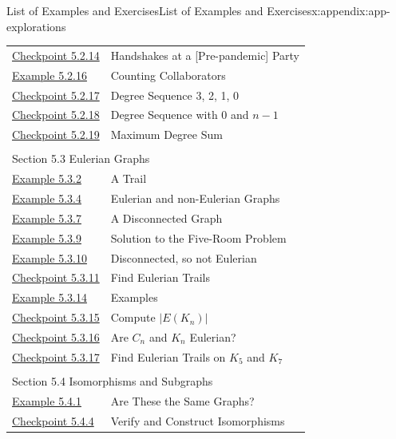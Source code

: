 \documentclass[oneside,10pt,]{book}
\numberwithin{equation}{section}
\begin{document}
\begin{appendixptx}{List of Examples and Exercises}{}{List of Examples and Exercises}{}{}{x:appendix:app-explorations}
\begin{longtable}[l]{ll}
\hyperref[x:exercise:ex-graph-handshake-lemma]{Checkpoint 5.2.14}& Handshakes at a [Pre-pandemic] Party\\
\hyperref[x:example:eg-graph-coauthors-answer]{Example 5.2.16}& Counting Collaborators\\
\hyperref[x:exercise:ex-graph-degree-0-4]{Checkpoint 5.2.17}& Degree Sequence 3, 2, 1, 0\\
\hyperref[x:exercise:ex-graph-degree-0-n-1]{Checkpoint 5.2.18}& Degree Sequence with 0 and \(n-1\)\\
\hyperref[x:exercise:ex-graph-degree-sum-max]{Checkpoint 5.2.19}& Maximum Degree Sum\\
\multicolumn{2}{l}{\null}\\[1.5ex] \multicolumn{2}{l}{\large Section 5.3 Eulerian Graphs}\\[0.5ex]
\hyperref[x:example:eg-graph-trail]{Example 5.3.2}& A Trail\\
\hyperref[x:example:eg-graph-eulerian]{Example 5.3.4}& Eulerian and non-Eulerian Graphs\\
\hyperref[x:example:eg-graph-connected]{Example 5.3.7}& A Disconnected Graph\\
\hyperref[x:example:eg-graph-model-room-solution]{Example 5.3.9}& Solution to the Five-Room Problem\\
\hyperref[x:example:eg-graph-not-eulerian]{Example 5.3.10}& Disconnected, so not Eulerian\\
\hyperref[x:exercise:ex-graph-find-eulerian-trail]{Checkpoint 5.3.11}& Find Eulerian Trails\\
\hyperref[x:example:eg-cycle-complete]{Example 5.3.14}& Examples\\
\hyperref[x:exercise:ex-graph-complete-edges]{Checkpoint 5.3.15}& Compute \(|E(K_n)|\)\\
\hyperref[x:exercise:ex-graph-cycle-complete-degrees]{Checkpoint 5.3.16}& Are \(C_n\) and \(K_n\) Eulerian?\\
\hyperref[x:exercise:ex-graph-complete-find-eulerian]{Checkpoint 5.3.17}& Find Eulerian Trails on \(K_5\) and \(K_7\)\\
\multicolumn{2}{l}{\null}\\[1.5ex] \multicolumn{2}{l}{\large Section 5.4 Isomorphisms and Subgraphs}\\[0.5ex]
\hyperref[x:example:eg-graph-equal-isomorphic]{Example 5.4.1}& Are These the Same Graphs?\\
\hyperref[x:exercise:ex-graph-isomorphism]{Checkpoint 5.4.4}& Verify and Construct Isomorphisms\\

\end{longtable}
\end{appendixptx}
\end{document}
